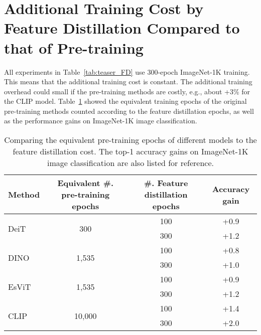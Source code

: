 \documentclass{article}
\begin{document}
\newpage
\section{Additional Training Cost by Feature Distillation Compared to that of Pre-training}

All experiments in Table~\ref{tab:teaser_FD} use 300-epoch ImageNet-1K training. This means that the additional training cost is constant. The additional training overhead could small if the pre-training methods are costly, e.g., about +3\% for the CLIP model. Table~\ref{tab:Efficiency} showed the equivalent training epochs of the original pre-training methods counted according to the feature distillation epochs, as well as the performance gains on ImageNet-1K image classification.

\begin{table}[h]
\caption{Comparing the equivalent pre-training epochs of different models to the feature distillation cost. The top-1 accuracy gains on ImageNet-1K image classification are also listed for reference.}
\centering
  \begin{tabular}{l|c|c|c}
  \toprule
  Method & Equivalent \#. pre-training epochs & \#. Feature distillation epochs & Accuracy gain \\
  \hline
  \multirow{2}{*}{DeiT} & \multirow{2}{*}{300} & 100 & +0.9 \\
   &  & 300 & +1.2 \\
   \hline
  \multirow{2}{*}{DINO} & \multirow{2}{*}{1,535} & 100 & +0.8 \\
    &   & 300 & +1.0 \\
   \hline
  \multirow{2}{*}{EsViT} & \multirow{2}{*}{1,535} & 100 & +0.9 \\
    &   & 300 & +1.2 \\
   \hline
  \multirow{2}{*}{CLIP} & \multirow{2}{*}{10,000} & 100 & +1.4 \\
    &   & 300 & +2.0 \\
  \bottomrule
  \end{tabular}
\label{tab:Efficiency}
\end{table}
\end{document}
